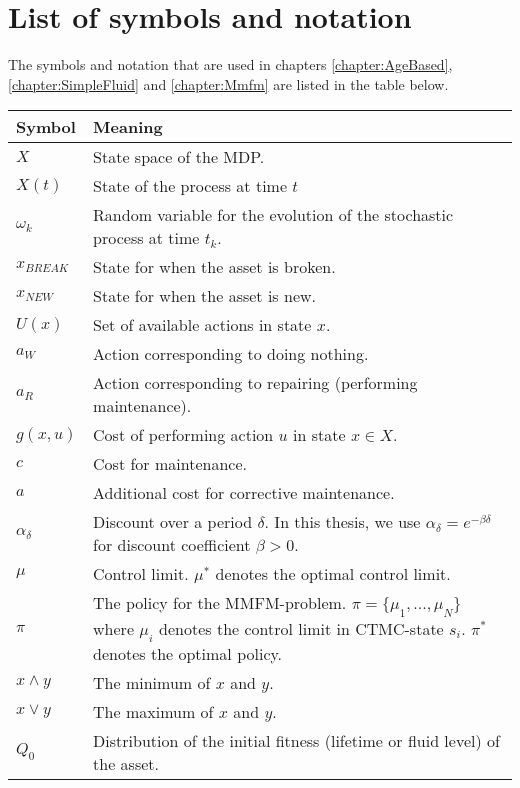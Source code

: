 \chapter{List of symbols and notation}\label{AppendixSymbolsAndNotation}
The symbols and notation that are used in chapters \ref{chapter:AgeBased}, \ref{chapter:SimpleFluid} and \ref{chapter:Mmfm} are listed in the table below.
	\begin{tabularx}{\linewidth}{l|L}\label{table:Symbols}
		Symbol        & Meaning         \\
		\hline                       
		$X$			& State space of the MDP. \\
		$X(t)$ & State of the process at time $t$ \\
		$\omega_k$ & Random variable for the evolution of the stochastic process at time $t_k$.\\   
		$x_{BREAK}$ & State for when the asset is broken.           \\
		$x_{NEW}$ & State for when the asset is new.\\   
		$U(x)$& Set of available actions in state $x$.\\
		$a_W$& Action corresponding to doing nothing.\\
		$a_R$& Action corresponding to repairing (performing maintenance). \\
		$g(x,u)$    & Cost of performing action $u$ in state $x\in X$.\\
		$c$& Cost for maintenance.\\
		$a$& Additional cost for corrective maintenance.\\
		$\alpha_\delta$ & Discount over a period $\delta$. In this thesis, we use $\alpha_\delta=e^{-\beta \delta}$ for discount coefficient $\beta>0$.\\       
		$\mu$ & Control limit. $\mu^*$ denotes the optimal control limit.\\
		$\pi$& The policy for the MMFM-problem. $\pi=\{\mu_1,...,\mu_N\}$ where $\mu_i$ denotes the control limit in CTMC-state $s_i$. $\pi^*$ denotes the optimal policy.\\
	    $x\wedge y$   & The minimum of $x$ and $y$.          \\       
        $x\vee y$     & The maximum of $x$ and $y$.\\
        $Q_0$ & Distribution of the initial fitness (lifetime or fluid level) of the asset.\\

\end{tabularx}
